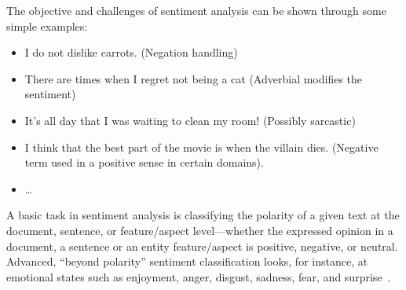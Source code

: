 The objective and challenges of sentiment analysis can be shown through some simple examples:
\begin{itemize}
	\item I do not dislike carrots. (Negation handling)
	\item There are times when I regret not being a cat (Adverbial modifies the sentiment)
	\item It's all day that I was waiting to clean my room! (Possibly sarcastic)
	\item I think that the best part of the movie is when the villain dies. (Negative term used in a positive sense in certain domains).
	\item \ldots
\end{itemize}

A basic task in sentiment analysis is classifying the polarity of a given text at the document, sentence, or feature/aspect level—whether the expressed opinion in a document, a sentence or an entity feature/aspect is positive, negative, or neutral. Advanced, “beyond polarity” sentiment classification looks, for instance, at emotional states such as enjoyment, anger, disgust, sadness, fear, and surprise~\cite{enwiki:1024880646}.

